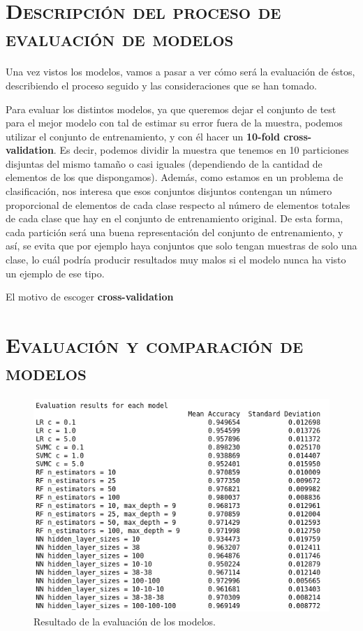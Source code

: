 \documentclass[11pt,a4paper]{article}
\begin{document}
\section{\textsc{Descripción del proceso de evaluación de modelos}}

Una vez vistos los modelos, vamos a pasar a ver cómo será la evaluación de éstos, describiendo el proceso seguido y las consideraciones que
se han tomado.

Para evaluar los distintos modelos, ya que queremos dejar el conjunto de test para el mejor modelo con tal de estimar su error fuera de la
muestra, podemos utilizar el conjunto de entrenamiento, y con él hacer un \textbf{10-fold cross-validation}. Es decir, podemos dividir
la muestra que tenemos en 10 particiones disjuntas del mismo tamaño o casi iguales (dependiendo de la cantidad de elementos de los que
dispongamos). Además, como estamos en un problema de clasificación, nos interesa que esos conjuntos disjuntos contengan un número proporcional
de elementos de cada clase respecto al número de elementos totales de cada clase que hay en el conjunto de entrenamiento original. De esta forma,
cada partición será una buena representación del conjunto de entrenamiento, y así, se evita que por ejemplo haya conjuntos que solo tengan
muestras de solo una clase, lo cuál podría producir resultados muy malos si el modelo nunca ha visto un ejemplo de ese tipo.

El motivo de escoger \textbf{cross-validation}

\section{\textsc{Evaluación y comparación de modelos}}

\begin{figure}[H]
    \centering
    \includegraphics[scale=0.6]{img/eval-results.png}
    \caption{Resultado de la evaluación de los modelos.}
    \label{fig:eval-results}
\end{figure}
\end{document}
